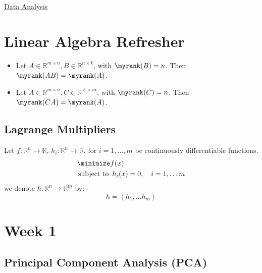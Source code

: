 \documentclass{article}
\begin{document}
\begin{center}
{\huge \underline{Data Analysis}}
\end{center}

\section*{Linear Algebra Refresher}
\begin{theorem} \hphantom{}
  \begin{itemize}
  \item Let $A \in \mathbb{R}^{m \times  n}, B  \in \mathbb{R}^{n \times  k}$, with $\myrank(B) = n$. Then $\myrank(AB) = \myrank(A)$. 
  \item Let $A \in \mathbb{R}^{m \times  n}, C \in \mathbb{R}^{\ell \times  m}$, with $\myrank(C) = n$. Then $\myrank(CA) = \myrank(A)$.  
\end{itemize}
\end{theorem}

\subsection{Lagrange Multipliers}
Let $f: \mathbb{R}^{n} \to \mathbb{R}$, $h_i: \mathbb{R}^{n} \to \mathbb{R}$, for $i=1, \ldots, m$ be continuously differentiable functions. 
\begin{align*}
  &\minimize f(x) \\
  &\operatorname*{\text{subject to}} \ h_i(x) = 0, \quad i=1, \ldots  m
\end{align*}
we denote $h: \mathbb{R}^{n} \to \mathbb{R}^{m}$ by:
\[
  h = (h_1, \ldots  h_m)
\]



\section{Week 1}
\subsection{Principal Component Analysis (PCA)}
\end{document}
